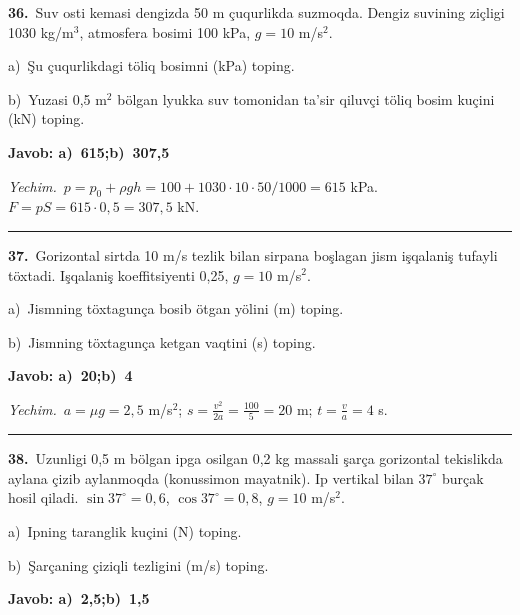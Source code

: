 \documentclass[11pt,a4paper]{article}
\begin{document}
\noindent\textbf{36.}\ Suv osti kemasi dengizda 50 m çuqurlikda suzmoqda. Dengiz suvining ziçligi 1030 kg/m$^3$, atmosfera bosimi 100 kPa, $g=10$ m/s$^2$.\par
\noindent\hspace*{4mm}a)\ Şu çuqurlikdagi töliq bosimni (kPa) toping.\par
\noindent\hspace*{4mm}b)\ Yuzasi 0,5 m$^2$ bölgan lyukka suv tomonidan ta’sir qiluvçi töliq bosim kuçini (kN) toping.\par
\noindent\colorbox{gray!12}{\parbox{\dimexpr\linewidth-2\fboxsep}{\textbf{Javob: a)\ 615;\quad b)\ 307,5}}}\par\smallskip
\noindent\textit{Yechim.}\ $p=p_0+\rho gh=100+1030\cdot10\cdot50/1000=615$ kPa. $F=pS=615\cdot0{,}5=307{,}5$ kN.\par\par\medskip\hrule\medskip
{}\noindent\textbf{37.}\ Gorizontal sirtda 10 m/s tezlik bilan sirpana boşlagan jism işqalaniş tufayli töxtadi. Işqalaniş koeffitsiyenti 0,25, $g=10$ m/s$^2$.\par
\noindent\hspace*{4mm}a)\ Jismning töxtagunça bosib ötgan yölini (m) toping.\par
\noindent\hspace*{4mm}b)\ Jismning töxtagunça ketgan vaqtini (s) toping.\par
\noindent\colorbox{gray!12}{\parbox{\dimexpr\linewidth-2\fboxsep}{\textbf{Javob: a)\ 20;\quad b)\ 4}}}\par\smallskip
\noindent\textit{Yechim.}\ $a=\mu g=2{,}5$ m/s$^2$; $s=\frac{v^2}{2a}=\frac{100}{5}=20$ m; $t=\frac{v}{a}=4$ s.\par\par\medskip\hrule\medskip
{}\noindent\textbf{38.}\ Uzunligi 0,5 m bölgan ipga osilgan 0,2 kg massali şarça gorizontal tekislikda aylana çizib aylanmoqda (konussimon mayatnik). Ip vertikal bilan $37^\circ$ burçak hosil qiladi. $\sin37^\circ=0{,}6$, $\cos37^\circ=0{,}8$, $g=10$ m/s$^2$.\par
\noindent\hspace*{4mm}a)\ Ipning taranglik kuçini (N) toping.\par
\noindent\hspace*{4mm}b)\ Şarçaning çiziqli tezligini (m/s) toping.\par
\noindent\colorbox{gray!12}{\parbox{\dimexpr\linewidth-2\fboxsep}{\textbf{Javob: a)\ 2,5;\quad b)\ 1,5}}}\par\smallskip
\end{document}

